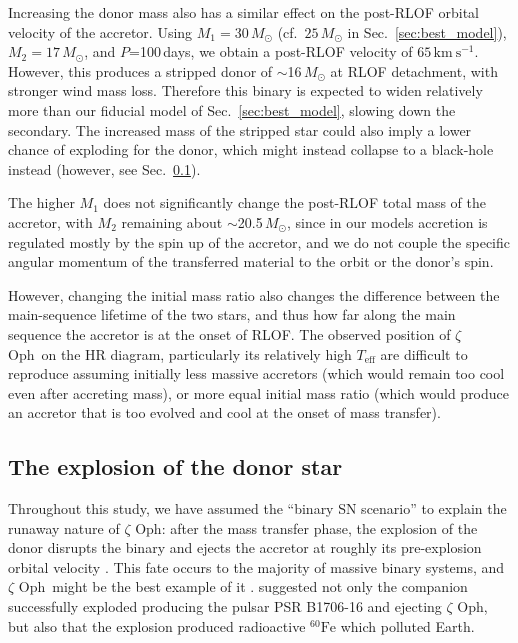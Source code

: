 \documentclass[twocolumn,twocolappendix,trackchanges]{aastex63}
\newcommand{\kms}{{\mathrm{km\ s^{-1}}}}
\DeclareRobustCommand{\Secref}[1]{Sec.~\ref{#1}}
\newcommand{\zoph}{$\zeta$ Oph}
\begin{document}
Increasing the donor mass also has a similar effect on the post-RLOF orbital velocity of the accretor. Using
$M_1=30\,M_\odot$ (cf.\ $25\,M_\odot$ in \Secref{sec:best_model}),
$M_2=17\,M_\odot$, and
$P$=100\,days, we obtain a post-RLOF velocity of
$65\,\kms$. However, this produces a stripped donor of
$\sim$16\,$M_\odot$ at RLOF detachment, with stronger wind mass loss. Therefore this binary is expected to widen relatively more than our fiducial model of \Secref{sec:best_model}, slowing down the secondary. The increased mass of the stripped star could also imply a lower chance of exploding for the donor, which might instead collapse to a black-hole instead (however, see \Secref{sec:SN_comp}).

The higher $M_1$ does not significantly change the post-RLOF total
mass of the accretor, with $M_2$ remaining about $\sim$20.5\,$M_\odot$, since
in our models accretion is regulated mostly by the spin up of the
accretor, and we do not couple the specific angular momentum of the transferred
material to the orbit or the donor's spin.

However, changing the initial mass ratio also changes the difference
between the main-sequence lifetime of the two stars, and thus how far
along the main sequence the accretor is at the onset of RLOF. The observed
position of \zoph\ on the HR diagram, particularly its relatively high
$T_\mathrm{eff}$ are difficult to reproduce assuming initially less
massive accretors (which would remain too cool even after accreting
mass), or more equal initial mass ratio (which would produce an
accretor that is too evolved and cool at the onset of mass transfer).

\subsection{The explosion of the donor star}
\label{sec:SN_comp}

Throughout this study, we have assumed the ``binary SN scenario'' to
explain the runaway nature of \zoph:
after the mass transfer phase, the explosion of the donor disrupts the
binary and ejects the accretor at roughly its pre-explosion orbital
velocity \citep[e.g.,][]{renzo:19walk}. This fate occurs to the
majority of massive binary systems, and \zoph\ might be the best
example of it \citep[e.g.,][]{blaauw:52, blaauw:61,
  hoogerwerf:00}. \cite{neuhauser:20} suggested not only the companion
successfully exploded producing the pulsar PSR B1706-16 and ejecting
\zoph, but also that the
explosion produced radioactive $^{60}\mathrm{Fe}$ which polluted
Earth.
\end{document}
